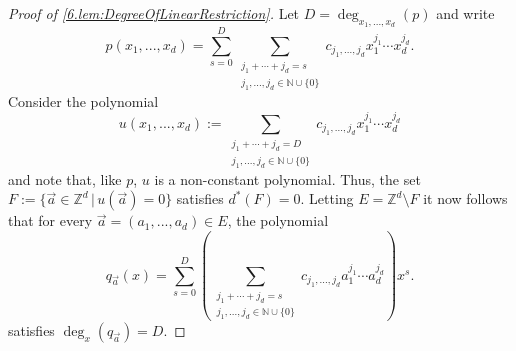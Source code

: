 \documentclass[10pt,a4paper]{amsart}
\newcommand{\N}{\mathbb{N}}
\newcommand{\Z}{\mathbb{Z}}
\begin{document}
\begin{proof}[Proof of \cref{6.lem:DegreeOfLinearRestriction}] Let $D=\deg_{x_1,...,x_d}(p)$ and   write
$$
p(x_1,...,x_d)=\sum_{s=0}^D\sum_{\substack{j_1+\cdots+j_d=s\\j_1,...,j_d\in\N\cup\{0\}}}c_{j_1,...,j_d}x_1^{j_1}\cdots x_d^{j_d}.
$$
Consider the polynomial 
$$
u(x_1,...,x_d):= \sum_{\substack{j_1+\cdots+j_d=D\\j_1,...,j_d\in\N\cup\{0\}}}c_{j_1,...,j_d}x_1^{j_1}\cdots x_d^{j_d}
$$
and note that, like $p$, $u$ is a non-constant polynomial. Thus,  the set $F:=\{\vec a\in\Z^d\,|\,u(\vec a)=0 \}$ satisfies $d^*(F)=0$. Letting $E=\Z^d\setminus F$ it now follows that for every $\vec a=(a_1,...,a_d)\in E$, the polynomial  
$$
q_{\vec a}(x)=\sum_{s=0}^D\left(\sum_{\substack{j_1+\cdots+j_d=s\\j_1,...,j_d\in\N\cup\{0\}}}c_{j_1,...,j_d}a_1^{j_1}\cdots a_d^{j_d}\right)x^s.
$$
satisfies $\deg_x(q_{\vec a})=D$.
\end{proof}
\end{document}
